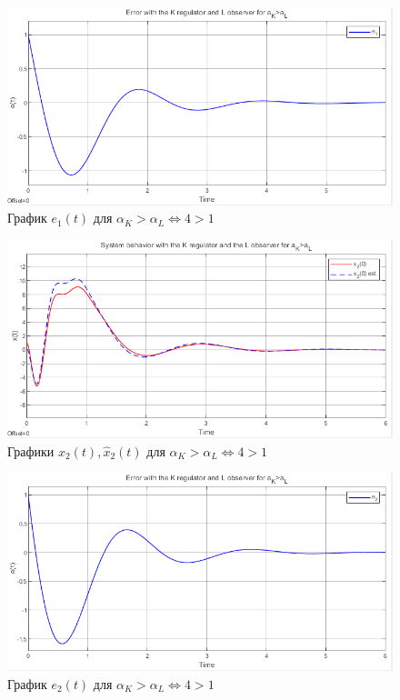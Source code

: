 \documentclass[a4paper, 12pt]{article}
\begin{document}
    \begin{figure}[H]
        \centering
        \includegraphics[scale=0.8]{2task_aKgaL_e1.png}
        \captionsetup{skip=0pt}
        \caption{График $e_1(t)$ для $\alpha_K>\alpha_L\Leftrightarrow4>1$}
        \label{2task_aKgaL_e1}
    \end{figure}
    \newpage
    \vspace*{20mm}
    \begin{figure}[H]
        \centering
        \includegraphics[scale=0.8]{2task_aKgaL_x2.png}
        \captionsetup{skip=0pt}
        \caption{Графики $x_2(t),\hat{x}_2(t)$ для $\alpha_K>\alpha_L\Leftrightarrow4>1$}
        \label{2task_aKgaL_x2}
    \end{figure}
    \begin{figure}[H]
        \centering
        \includegraphics[scale=0.8]{2task_aKgaL_e2.png}
        \captionsetup{skip=0pt}
        \caption{График $e_2(t)$ для $\alpha_K>\alpha_L\Leftrightarrow4>1$}
        \label{2task_aKgaL_e2}
    \end{figure}
\end{document}
